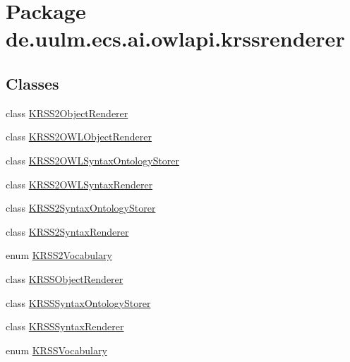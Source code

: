 \hypertarget{namespacede_1_1uulm_1_1ecs_1_1ai_1_1owlapi_1_1krssrenderer}{\section{Package de.\-uulm.\-ecs.\-ai.\-owlapi.\-krssrenderer}
\label{namespacede_1_1uulm_1_1ecs_1_1ai_1_1owlapi_1_1krssrenderer}
}
\subsection*{Classes}
\begin{DoxyCompactItemize}
\item 
class \hyperlink{classde_1_1uulm_1_1ecs_1_1ai_1_1owlapi_1_1krssrenderer_1_1_k_r_s_s2_object_renderer}{K\-R\-S\-S2\-Object\-Renderer}
\item 
class \hyperlink{classde_1_1uulm_1_1ecs_1_1ai_1_1owlapi_1_1krssrenderer_1_1_k_r_s_s2_o_w_l_object_renderer}{K\-R\-S\-S2\-O\-W\-L\-Object\-Renderer}
\item 
class \hyperlink{classde_1_1uulm_1_1ecs_1_1ai_1_1owlapi_1_1krssrenderer_1_1_k_r_s_s2_o_w_l_syntax_ontology_storer}{K\-R\-S\-S2\-O\-W\-L\-Syntax\-Ontology\-Storer}
\item 
class \hyperlink{classde_1_1uulm_1_1ecs_1_1ai_1_1owlapi_1_1krssrenderer_1_1_k_r_s_s2_o_w_l_syntax_renderer}{K\-R\-S\-S2\-O\-W\-L\-Syntax\-Renderer}
\item 
class \hyperlink{classde_1_1uulm_1_1ecs_1_1ai_1_1owlapi_1_1krssrenderer_1_1_k_r_s_s2_syntax_ontology_storer}{K\-R\-S\-S2\-Syntax\-Ontology\-Storer}
\item 
class \hyperlink{classde_1_1uulm_1_1ecs_1_1ai_1_1owlapi_1_1krssrenderer_1_1_k_r_s_s2_syntax_renderer}{K\-R\-S\-S2\-Syntax\-Renderer}
\item 
enum \hyperlink{enumde_1_1uulm_1_1ecs_1_1ai_1_1owlapi_1_1krssrenderer_1_1_k_r_s_s2_vocabulary}{K\-R\-S\-S2\-Vocabulary}
\item 
class \hyperlink{classde_1_1uulm_1_1ecs_1_1ai_1_1owlapi_1_1krssrenderer_1_1_k_r_s_s_object_renderer}{K\-R\-S\-S\-Object\-Renderer}
\item 
class \hyperlink{classde_1_1uulm_1_1ecs_1_1ai_1_1owlapi_1_1krssrenderer_1_1_k_r_s_s_syntax_ontology_storer}{K\-R\-S\-S\-Syntax\-Ontology\-Storer}
\item 
class \hyperlink{classde_1_1uulm_1_1ecs_1_1ai_1_1owlapi_1_1krssrenderer_1_1_k_r_s_s_syntax_renderer}{K\-R\-S\-S\-Syntax\-Renderer}
\item 
enum \hyperlink{enumde_1_1uulm_1_1ecs_1_1ai_1_1owlapi_1_1krssrenderer_1_1_k_r_s_s_vocabulary}{K\-R\-S\-S\-Vocabulary}
\end{DoxyCompactItemize}
